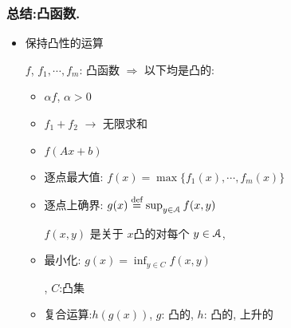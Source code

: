 \documentclass[handout,10pt]{beamer}
\begin{document}
\begin{frame}
\frametitle{总结:凸函数.}
\begin{itemize}

\item 保持凸性的运算

$f$, $f_1,\cdots, f_m$: 凸函数 $\Rightarrow$
以下均是凸的:

\begin{footnotesize}
	
	\begin{itemize}
		\item $\alpha f$, $\alpha >0$
		\item $f_1 + f_2$ $\rightarrow$ 无限求和
		\item $f(Ax+b)$
		
		\item 逐点最大值: $f(x) = \max\{f_1(x),\cdots, f_m(x)\}$
		
		
		\item 逐点上确界:
		$
		g(x)\stackrel{\textnormal{def}}{=} \sup_{y\in \mathcal{A}}^{} f(x,y)
		$
		
		$f(x,y)$ 是关于 $x$凸的对每个 $y\in \mathcal{A}$,
		
		 \doublestar
		
		\item 最小化: $g(x) = \inf_{y\in C} f(x,y)$
		
		, $C$:凸集
		
		
		\item 复合运算:\mystar  $h(g(x))$, $g$: 凸的, $h$: 凸的, 上升的
	\end{itemize}
	
\end{footnotesize}
\end{itemize}

\end{frame}
\end{document}
